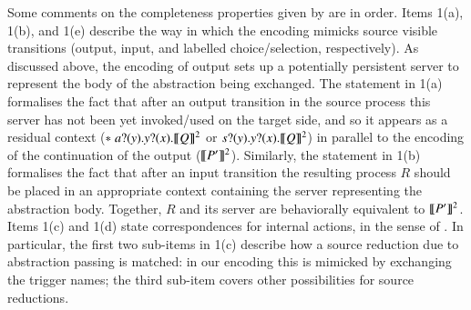 \documentclass[preprint,11pt]{elsarticle}
\begin{document}
{Some comments on the completeness properties given by  are in order. Items 1(a), 1(b), and 1(e) describe the way in which 
the encoding mimicks source visible transitions (output, input, and labelled choice/selection, respectively). 
As discussed above, the encoding of output 
sets up a potentially persistent server to represent the body of the abstraction being exchanged. 
The statement in 1(a) formalises the fact that 
after an output transition in the source process this server has not been yet invoked/used on the target side, and so it appears as a
residual context ($\ast\;a ? (y) . y ? (x) . \llbracket Q\rrbracket^2$ or $s ? (y) . y ? (x) . \llbracket Q\rrbracket^2$)
in parallel to the encoding of the continuation of the output ($\llbracket P'\rrbracket^2$).
Similarly, the statement in 1(b) formalises the fact that after an input transition the resulting process $R$ should be 
placed in an appropriate context containing the server representing the abstraction body. 
Together, $R$ and its server are behaviorally equivalent to $\llbracket P'\rrbracket^2$.
Items 1(c) and 1(d) state correspondences for internal actions, in the sense of .
In particular, the first two sub-items in 1(c) describe how a source reduction due to abstraction passing is matched: in our encoding
this is mimicked by exchanging the trigger names; the third sub-item covers other possibilities for source reductions. 

}
\end{document}
